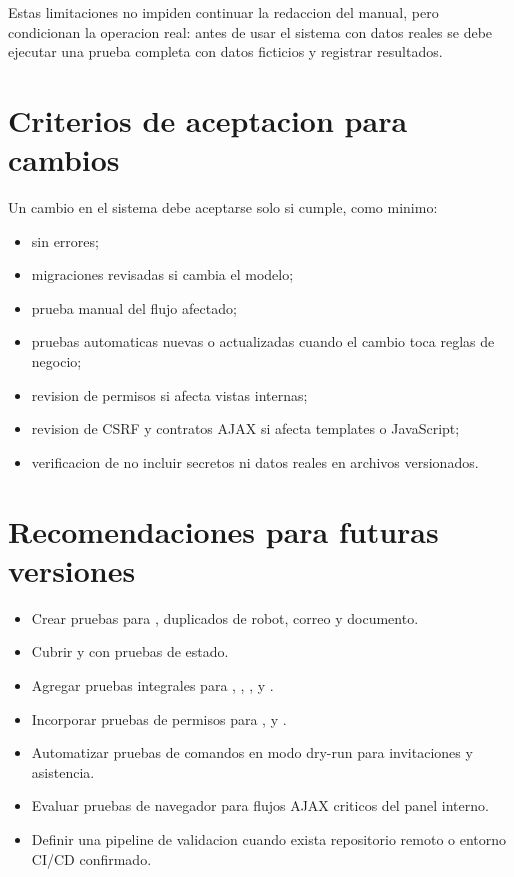 Estas limitaciones no impiden continuar la redaccion del manual, pero condicionan la operacion real: antes de usar el sistema con datos reales se debe ejecutar una prueba completa con datos ficticios y registrar resultados.

\section{Criterios de aceptacion para cambios}
\label{sec:pruebas-criterios-cambios}

Un cambio en el sistema debe aceptarse solo si cumple, como minimo:

\begin{itemize}
  \item {} sin errores;
  \item migraciones revisadas si cambia el modelo;
  \item prueba manual del flujo afectado;
  \item pruebas automaticas nuevas o actualizadas cuando el cambio toca reglas de negocio;
  \item revision de permisos si afecta vistas internas;
  \item revision de CSRF y contratos AJAX si afecta templates o JavaScript;
  \item verificacion de no incluir secretos ni datos reales en archivos versionados.
\end{itemize}

\section{Recomendaciones para futuras versiones}
\label{sec:pruebas-recomendaciones}

\begin{itemize}
  \item Crear pruebas para , duplicados de robot, correo y documento.
  \item Cubrir  y  con pruebas de estado.
  \item Agregar pruebas integrales para , , ,  y .
  \item Incorporar pruebas de permisos para ,  y .
  \item Automatizar pruebas de comandos en modo dry-run para invitaciones y asistencia.
  \item Evaluar pruebas de navegador para flujos AJAX criticos del panel interno.
  \item Definir una pipeline de validacion cuando exista repositorio remoto o entorno CI/CD confirmado.
\end{itemize}
